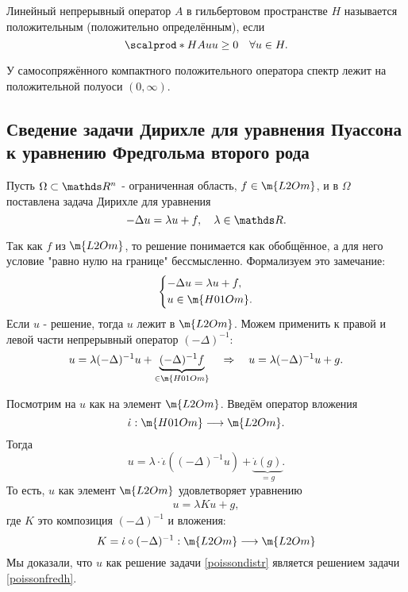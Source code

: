 \begin{definition}
Линейный непрерывный оператор $A$ в гильбертовом пространстве $H$ называется положительным (положительно определённым), если
$$ \scalprod*{H}{Au}{u} \geq 0 \quad \forall u \in H.$$
\end{definition}

\begin{note} У самосопряжённого компактного положительного оператора спектр лежит на положительной полуоси $(0, \infty)$.
\end{note}


\subsection{Сведение задачи Дирихле для уравнения Пуассона к уравнению Фредгольма второго рода}
Пусть $\Omega \subset \real^n$ - ограниченная область, $f \in \m{L2Om}$, и в $\Omega$ поставлена задача Дирихле для уравнения
$$ - \Delta u = \lambda u + f, \quad \lambda \in \real.$$

Так как $f$ из $\m{L2Om}$, то решение понимается как обобщённое, а для него условие "равно нулю на границе" бессмысленно. Формализуем это замечание:
\begin{align}
	\begin{cases*}
		- \Delta u = \lambda u + f, \\
		u \in \m{H01Om}.
	\end{cases*}
\label{poissondistr}
\end{align} 
Если $u$ - решение, тогда $u$ лежит в  $\m{L2Om}$. Можем применить к правой и левой части непрерывный оператор $(-\Delta)^{-1}$:
$$ u = \lambda (-\Delta)^{-1}u + \underbrace{(-\Delta)^{-1}f}_{\in \m{H01Om}} \quad \Rightarrow \quad u = \lambda (-\Delta)^{-1} u + g.$$

Посмотрим на $u$ как на элемент $\m{L2Om}$. Введём оператор вложения
$$ \dot\iota : \m{H01Om} \longrightarrow \m{L2Om}.$$
Тогда
$$ u = \lambda \cdot \dot\iota ( (- \Delta)^{-1} u) + \underbrace {\dot\iota(g)}_{=g}.$$
То есть, $u$ как элемент $\m{L2Om}$ удовлетворяет уравнению
\begin{align}
	u = \lambda K u + g,
\label{poissonfredh}
\end{align}
где $K$ это композиция $(-\Delta)^{-1}$ и вложения:
$$ K = \dot\iota \circ (-\Delta)^{-1} : \m{L2Om} \longrightarrow \m{L2Om} $$
Мы доказали, что $u$ как решение задачи \eqref{poissondistr} является решением задачи \eqref{poissonfredh}.

